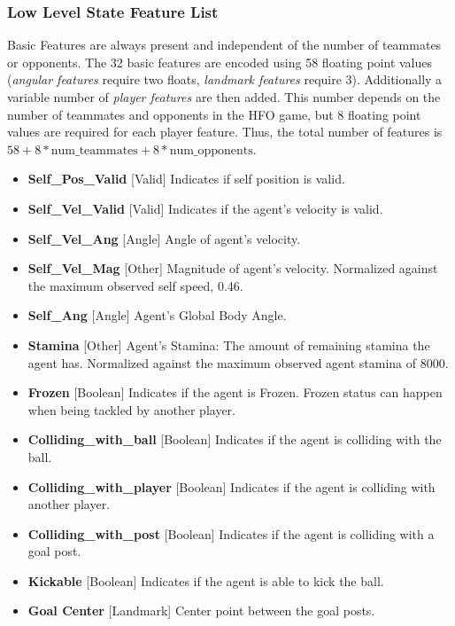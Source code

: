 \documentclass[12pt]{article}
\begin{document}
\subsubsection{Low Level State Feature List}

Basic Features are always present and independent of the number of
teammates or opponents. The 32 basic features are encoded using 58
floating point values (\textit{angular features} require two floats,
\textit{landmark features} require 3). Additionally a variable number
of \textit{player features} are then added. This number depends on the
number of teammates and opponents in the HFO game, but 8 floating
point values are required for each player feature. Thus, the total
number of features is $58 + 8*\textrm{num\_teammates} +
8*\textrm{num\_opponents}$.

\begin{itemize}
  \item{\textbf{Self\_Pos\_Valid} [Valid] Indicates if self position is valid.}
  \item{\textbf{Self\_Vel\_Valid} [Valid] Indicates if the agent's velocity is valid.}
  \item{\textbf{Self\_Vel\_Ang} [Angle] Angle of agent's velocity.}
  \item{\textbf{Self\_Vel\_Mag} [Other] Magnitude of agent's
    velocity. Normalized against the maximum observed self speed,
    0.46.}
  \item{\textbf{Self\_Ang} [Angle] Agent's Global Body Angle.}
  \item{\textbf{Stamina} [Other] Agent's Stamina: The amount of remaining stamina the
    agent has. Normalized against the maximum observed agent stamina
    of 8000.}
  \item{\textbf{Frozen} [Boolean] Indicates if the agent is Frozen. Frozen status can
    happen when being tackled by another player.}
  \item{\textbf{Colliding\_with\_ball} [Boolean] Indicates if the agent
    is colliding with the ball.}
  \item{\textbf{Colliding\_with\_player} [Boolean] Indicates if the agent
    is colliding with another player.}
  \item{\textbf{Colliding\_with\_post} [Boolean] Indicates if the agent
    is colliding with a goal post.}
  \item{\textbf{Kickable} [Boolean] Indicates if the agent is able to
    kick the ball.}
  \item{\textbf{Goal Center} [Landmark] Center point between the goal posts.}

\end{itemize}
\end{document}
